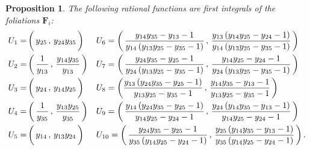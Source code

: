 \documentclass[11pt]{amsart}
\newcommand{\sk}{\smallskip}
\newtheorem{prop}[thm]{Proposition}
\begin{document}
\begin{prop}  
The following rational functions are first integrals of the foliations $\boldsymbol{F}_i$: 
\begin{align}
\label{Eq:Formules-Ui}
U_1
=&\, \bigg(\, {y_{25}}\, , \,  {y_{24}} {y_{35}}
\, \bigg)
&&
U_6
=
 \bigg(\, 
\frac{{y_{14}} {y_{35}} -{y_{13}} -1}{{y_{14}} \left({y_{13}} {y_{25}} -{y_{35}} -1\right) }
 \, , \, 
\frac{ {y_{13}}\left({y_{14}} {y_{25}} -{y_{24}} -1\right)}{{y_{14}} \left({y_{13}} {y_{25}} -{y_{35}} -1\right) }
 \,
\bigg) 
\nonumber
\\   \sk 
 U_2
=&\,
\bigg(\, \frac{1}{y_{13}}\, , \, 
\frac{{y_{14}} {y_{35}}}{{y_{13}}}\, \bigg)
&&
 U_7
=
\bigg(\, 
\frac{{y_{24}} {y_{35}} -{y_{25}} -1}{{y_{24}}\left({y_{13}} {y_{25}} -{y_{35}} -1\right) }
 \, , \, 
\frac{{y_{14}} {y_{25}} -{y_{24}} -1}{{y_{24}}\left({y_{13}} {y_{25}} -{y_{35}} -1\right) }
 \, 
\bigg)
\nonumber \\ \sk 
 U_3
=&\,
  \bigg( 
  \, {y_{24}}
 \, , \,  
   {y_{14}} {y_{25}}
   \, \bigg)
   &&
 U_8
=\bigg( 
\frac{{y_{13}} \left({y_{24}} {y_{35}} -{y_{25}} -1\right)}{{y_{13}} {y_{25}} -{y_{35}} -1}
 \, , \, 
\frac{{y_{14}} {y_{35}} -{y_{13}} -1}{{y_{13}} {y_{25}} -{y_{35}} -1}
 \,
\bigg)
\\ \sk 
 U_4
=&\,
\bigg(\,  \frac{1}{y_{35}}
\, , \, 
\frac{{y_{13}} {y_{25}}}{{y_{35}}}
\,
\bigg)
&&
 U_9
= 
 \bigg( 
\, 
\frac{{y_{14}} \left({y_{24}} {y_{35}} -{y_{25}} -1\right)}{{y_{14}} {y_{25}} -{y_{24}} -1}
 \, , \,
\frac{{y_{24}}\left({y_{14}} {y_{35}} -{y_{13}} -1\right) }{{y_{14}} {y_{25}} -{y_{24}} -1}
 \, \bigg)
\nonumber \\ \sk 
 U_5
=&\,  \bigg(\, {y_{14}}
\, , \, 
 {y_{13}} {y_{24}}
 \, 
\bigg) 
&& 
 U_{10}
=
\bigg( \, 
\frac{{y_{24}} {y_{35}} -{y_{25}} -1}{{y_{35}}\left({y_{14}} {y_{25}} -{y_{24}} -1\right) }
 \, , \,
\frac{ {y_{25}} \left({y_{14}} {y_{35}} -{y_{13}} -1\right)}{{y_{35}}\left({y_{14}} {y_{25}} -{y_{24}} -1\right) }\,
\bigg) 
\, . \nonumber
\end{align}
\end{prop} 
\end{document}
